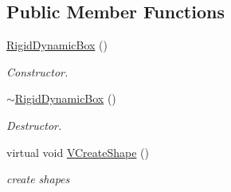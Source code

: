 \subsection*{Public Member Functions}
\begin{DoxyCompactItemize}
\item 
\hypertarget{classContent_1_1Actor_1_1Admin_1_1RigidDynamicBox_a642170833f35c212a522527b378065cf}{
\hyperlink{classContent_1_1Actor_1_1Admin_1_1RigidDynamicBox_a642170833f35c212a522527b378065cf}{RigidDynamicBox} ()}
\label{classContent_1_1Actor_1_1Admin_1_1RigidDynamicBox_a642170833f35c212a522527b378065cf}

\begin{DoxyCompactList}\small\item\em Constructor. \item\end{DoxyCompactList}\item 
\hypertarget{classContent_1_1Actor_1_1Admin_1_1RigidDynamicBox_ae33d2e210c2717ffae78e5dccfeb3b70}{
\hyperlink{classContent_1_1Actor_1_1Admin_1_1RigidDynamicBox_ae33d2e210c2717ffae78e5dccfeb3b70}{$\sim$RigidDynamicBox} ()}
\label{classContent_1_1Actor_1_1Admin_1_1RigidDynamicBox_ae33d2e210c2717ffae78e5dccfeb3b70}

\begin{DoxyCompactList}\small\item\em Destructor. \item\end{DoxyCompactList}\item 
\hypertarget{classContent_1_1Actor_1_1Admin_1_1RigidDynamicBox_a29dcfca0a44d7599c98a9ce51ecb27cc}{
virtual void \hyperlink{classContent_1_1Actor_1_1Admin_1_1RigidDynamicBox_a29dcfca0a44d7599c98a9ce51ecb27cc}{VCreateShape} ()}
\label{classContent_1_1Actor_1_1Admin_1_1RigidDynamicBox_a29dcfca0a44d7599c98a9ce51ecb27cc}

\begin{DoxyCompactList}\small\item\em create shapes \item\end{DoxyCompactList}\end{DoxyCompactItemize}
